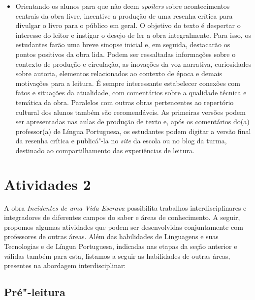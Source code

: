 \documentclass[12pt]{extarticle}
\begin{document}
\begin{itemize}
\item
  Orientando os alunos para que não deem \emph{spoilers} sobre
  acontecimentos centrais da obra livre, incentive a produção de uma
  resenha crítica para divulgar o livro para o público em geral. O
  objetivo do texto é despertar o interesse do leitor e instigar o
  desejo de ler a obra integralmente. Para isso, os estudantes farão uma
  breve sinopse inicial e, em seguida, destacarão os pontos positivos da
  obra lida. Podem ser ressaltadas informações sobre o contexto de
  produção e circulação, as inovações da voz narrativa, curiosidades
  sobre autoria, elementos relacionados ao contexto de época e demais
  motivações para a leitura. É sempre interessante estabelecer conexões
  com fatos e situações da atualidade, com comentários sobre a qualidade
  técnica e temática da obra. Paralelos com outras obras pertencentes ao
  repertório cultural dos alunos também são recomendáveis. As primeiras
  versões podem ser apresentadas nas aulas de produção de texto e, após
  os comentários do(a) professor(a) de Língua Portuguesa, os estudantes
  podem digitar a versão final da resenha crítica e publicá"-la no
  \emph{site} da escola ou no blog da turma, destinado ao
  compartilhamento das experiências de leitura.
\end{itemize}


\section{Atividades 2}


A obra \emph{Incidentes de uma Vida Escrava} possibilita trabalhos
interdisciplinares e integradores de diferentes campos do saber e áreas
de conhecimento. A seguir, propomos algumas atividades que podem ser
desenvolvidas conjuntamente com professores de outras áreas. Além das
habilidades de Linguagens e suas Tecnologias e de Língua Portuguesa,
indicadas nas etapas da seção anterior e válidas também para esta,
listamos a seguir as habilidades de outras áreas, presentes na abordagem
interdisciplinar:

\subsection{Pré"-leitura}
\end{document}
